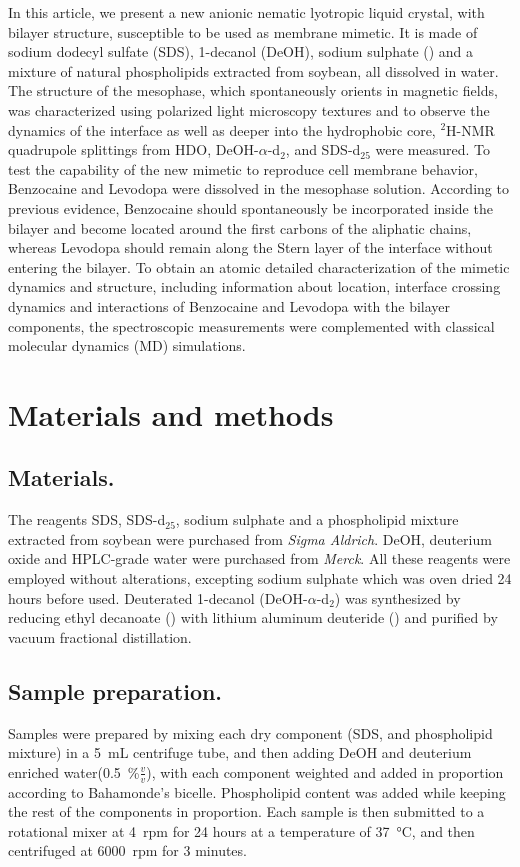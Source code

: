 \documentclass[3p,preprint,review]{elsarticle}
\begin{document}
	In this article, we present a new anionic nematic lyotropic liquid crystal,
	with bilayer structure, susceptible to be used as membrane mimetic. It is made
	of sodium dodecyl sulfate (SDS), 1-decanol (DeOH), sodium sulphate
	()
	and a mixture of natural phospholipids extracted from soybean, all dissolved in
	water. The structure of the mesophase, which spontaneously orients in magnetic
	fields,
	was characterized using polarized light microscopy textures and to observe the
	dynamics
	of the interface as well as deeper into the hydrophobic core, $^2$H-NMR
	quadrupole splittings from HDO, DeOH-$\alpha$-d$_2$, and SDS-d$_{25}$ were
	measured. To test the capability of the new mimetic to reproduce
	cell membrane behavior, Benzocaine and Levodopa were dissolved in the mesophase
	solution. According to previous evidence, Benzocaine should spontaneously be
	incorporated inside the bilayer and become located around the first carbons of
  the aliphatic chains\cite{Martin2014a},
	whereas Levodopa should remain along the Stern layer of the interface without
  entering the bilayer\cite{Orowski2012}. 
	To obtain an atomic detailed characterization of the mimetic dynamics and
	structure, including information about location, interface crossing dynamics
	and
	interactions of Benzocaine and Levodopa with the bilayer components, the
	spectroscopic measurements were complemented with classical molecular dynamics
	(MD) simulations.
	
	\section{Materials and methods}
	\subsection{Materials.}
	The reagents SDS, SDS-d$_{25}$, sodium sulphate and a phospholipid mixture
	extracted from soybean were purchased from \textit{Sigma Aldrich}. DeOH,
	deuterium oxide and HPLC-grade water were purchased from \textit{Merck}. All
	these reagents were employed without alterations, excepting sodium sulphate
	which was oven dried 24 hours before used. Deuterated 1-decanol
	(DeOH-$\alpha$-d$_2$) was synthesized by reducing ethyl decanoate
	() with lithium aluminum deuteride () and
	purified by vacuum fractional distillation.\\
	\subsection{Sample preparation.}
	Samples were prepared by mixing each dry component (SDS,  and
	phospholipid mixture) in a \SI{5}{mL} centrifuge tube, and then adding DeOH and
	deuterium enriched water(\SI{0.5}{\percent}$\tfrac{v}{v}$), with each
	component
	weighted and added in proportion according to Bahamonde's
	bicelle\cite{Bahamonde-Padilla2013}. Phospholipid content was added while
	keeping the rest of the components in
	proportion. Each sample is then submitted to a
	rotational mixer at \SI{4}{rpm} for 24 hours at a temperature of
	\SI{37}{\celsius}, and then centrifuged at \SI{6000}{rpm} for 3 minutes.
	
\end{document}
